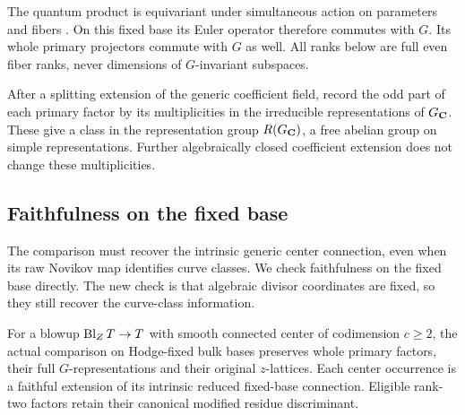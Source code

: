 The quantum product is equivariant under simultaneous action on parameters
and fibers \cite[Lemma~7]{IritaniHodge}. On this fixed base its Euler operator
therefore commutes with $G$. Its whole primary projectors commute with $G$
as well. All ranks below are full even fiber ranks, never dimensions of
$G$-invariant subspaces.

After a splitting extension of the generic coefficient field, record the
odd part of each primary factor by its multiplicities in the irreducible
representations of $G_\mathbf C$. These give a class in the representation group
$R(G_\mathbf C)$, a free abelian group on simple representations. Further
algebraically closed coefficient extension does not change these
multiplicities.

\subsection{Faithfulness on the fixed base}

The comparison must recover the intrinsic generic center connection, even
when its raw Novikov map identifies curve classes. We check faithfulness
on the fixed base directly. The new check is that algebraic divisor
coordinates are fixed, so they still recover the curve-class information.

\begin{lemma}
\label{lem:hodge-fixed-comparison}%
For a blowup $\operatorname{Bl}_ZT\to T$ with smooth connected center of codimension
$c\geq2$, the actual comparison on Hodge-fixed bulk bases preserves whole
primary factors, their full $G$-representations and their original
$z$-lattices. Each center occurrence is a faithful extension of its
intrinsic reduced fixed-base connection. Eligible rank-two factors retain
their canonical modified residue discriminant.
\end{lemma}

